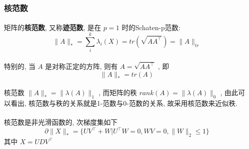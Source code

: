 \documentclass[UTF8]{ctexart}
\numberwithin{equation}{section}
\begin{document}
			\subsubsection{核范数}
				\paragraph{}
					\quad 矩阵的\textbf{核范数}, 又称\textbf{迹范数}, 是在 $p = 1$ 时的Schaten-p范数:
					\[
							\lVert{A}\rVert_*
						=	\sum_i^k \lambda_i(X)
						=	tr(\sqrt{A A^\top})
						=	\lVert{A}\rVert_{tr}
					\]

				\paragraph{}
					\quad 特别的, 当 $A$ 是对称正定的方阵, 则有 $ A = \sqrt{A A^\top}$ , 即
					\[
						\lVert{A}\rVert_* = tr(A)
					\]

				\paragraph{}
					\quad 核范数 $\lVert{A}\rVert_* = \lVert{\lambda(A)}\rVert_1$ , 而矩阵的秩 $rank(A) = \lVert{\lambda(A)}\rVert_0$ , 由此可以看出, 核范数与秩的关系就是1-范数与0-范数的关系, 故采用核范数来近似秩.

				\paragraph{}
					\quad 核范数是非光滑函数的, 次梯度集如下
					\begin{equation}\label{NuNormSubGrad}
							\partial \lVert{X}\rVert_*
						=	\{U V^\top + W \vert U^\top W = 0,WV = 0, \lVert{W}\rVert_2 \leq 1\}
					\end{equation}
					其中 $X = U D V^\top$
	
\end{document}
